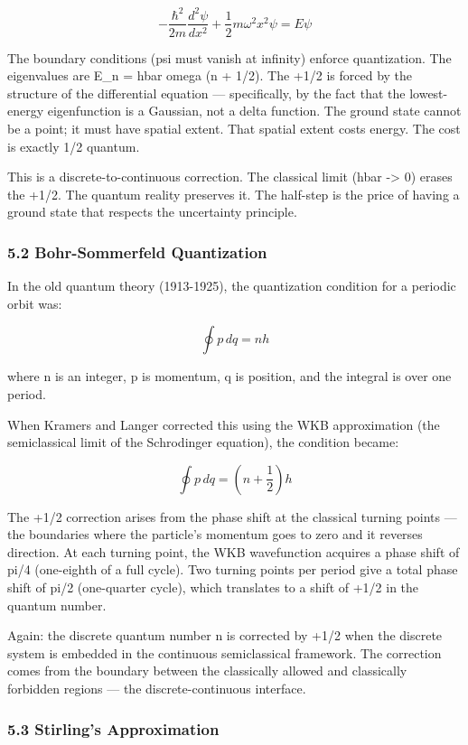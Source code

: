 \documentclass[
]{article}
\begin{document}
\[-\frac{\hbar^2}{2m}\frac{d^2\psi}{dx^2} + \frac{1}{2}m\omega^2 x^2 \psi = E\psi\]

The boundary conditions (psi must vanish at infinity) enforce
quantization. The eigenvalues are E\_n = hbar omega (n + 1/2). The +1/2
is forced by the structure of the differential equation ---
specifically, by the fact that the lowest-energy eigenfunction is a
Gaussian, not a delta function. The ground state cannot be a point; it
must have spatial extent. That spatial extent costs energy. The cost is
exactly 1/2 quantum.

This is a discrete-to-continuous correction. The classical limit (hbar
-\textgreater{} 0) erases the +1/2. The quantum reality preserves it.
The half-step is the price of having a ground state that respects the
uncertainty principle.

\subsubsection{5.2 Bohr-Sommerfeld
Quantization}\label{bohr-sommerfeld-quantization}

In the old quantum theory (1913-1925), the quantization condition for a
periodic orbit was:

\[\oint p \, dq = nh\]

where n is an integer, p is momentum, q is position, and the integral is
over one period.

When Kramers and Langer corrected this using the WKB approximation (the
semiclassical limit of the Schrodinger equation), the condition became:

\[\oint p \, dq = \left(n + \frac{1}{2}\right)h\]

The +1/2 correction arises from the phase shift at the classical turning
points --- the boundaries where the particle's momentum goes to zero and
it reverses direction. At each turning point, the WKB wavefunction
acquires a phase shift of pi/4 (one-eighth of a full cycle). Two turning
points per period give a total phase shift of pi/2 (one-quarter cycle),
which translates to a shift of +1/2 in the quantum number.

Again: the discrete quantum number n is corrected by +1/2 when the
discrete system is embedded in the continuous semiclassical framework.
The correction comes from the boundary between the classically allowed
and classically forbidden regions --- the discrete-continuous interface.

\subsubsection{5.3 Stirling's
Approximation}\label{stirlings-approximation}
\end{document}
